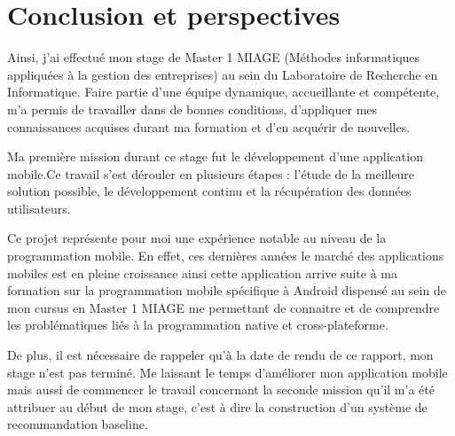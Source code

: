 \chapter*{Conclusion et perspectives}
\label{sec:conclusion}

Ainsi, j’ai effectué mon stage de Master 1 MIAGE (Méthodes informatiques appliquées à la gestion des entreprises) au sein du Laboratoire de Recherche en Informatique. Faire partie d’une équipe dynamique, accueillante et compétente, m'a permis de travailler dans de bonnes conditions, d'appliquer mes connaissances acquises durant ma formation et d'en acquérir de nouvelles.  

 

Ma première mission durant ce stage fut le développement d'une application mobile.Ce travail s'est dérouler en plusieurs étapes : l'étude de la meilleure solution possible, le développement continu et la récupération des données utilisateurs.  

 

Ce projet représente pour moi une expérience notable au niveau de la programmation mobile. En effet, ces dernières années le marché des applications mobiles est en pleine croissance ainsi cette application arrive suite à ma formation sur la programmation mobile spécifique à Android dispensé au sein de mon cursus en Master 1 MIAGE me permettant de connaitre et de comprendre les problématiques liés à la programmation native et cross-plateforme. 
 

De plus, il est nécessaire de rappeler qu’à la date de rendu de ce rapport, mon stage n’est pas terminé. Me laissant le temps d'améliorer mon application mobile mais aussi de commencer le travail concernant la seconde mission qu'il m'a été attribuer au début de mon stage, c'est à dire la construction d'un système de recommandation baseline.


